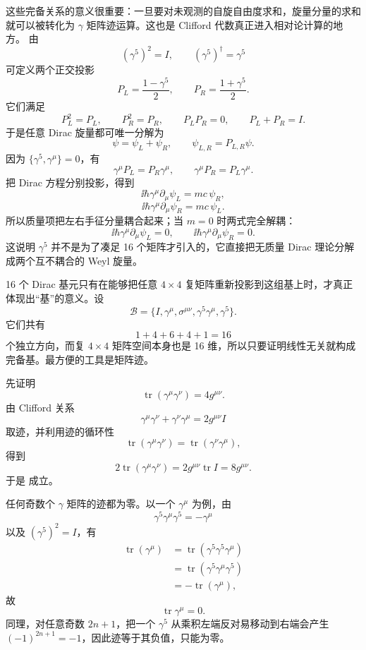 这些完备关系的意义很重要：一旦要对未观测的自旋自由度求和，旋量分量的求和就可以被转化为 $\gamma$ 矩阵迹运算。这也是 Clifford 代数真正进入相对论计算的地方。
由
\[
(\gamma^5)^2=I,
\qquad
(\gamma^5)^\dagger=\gamma^5
\]
可定义两个正交投影
\[
P_L=\frac{1-\gamma^5}{2},
\qquad
P_R=\frac{1+\gamma^5}{2}.
\]
它们满足
\[
P_L^2=P_L,
\qquad
P_R^2=P_R,
\qquad
P_LP_R=0,
\qquad
P_L+P_R=I.
\]
于是任意 Dirac 旋量都可唯一分解为
\[
\psi=\psi_L+\psi_R,
\qquad
\psi_{L,R}=P_{L,R}\psi.
\]
因为 $\{\gamma^5,\gamma^\mu\}=0$，有
\[
\gamma^\mu P_L=P_R\gamma^\mu,
\qquad
\gamma^\mu P_R=P_L\gamma^\mu.
\]
把 Dirac 方程分别投影，得到
\[
\ii\hbar\gamma^\mu\partial_\mu\psi_L=mc\,\psi_R,
\]
\[
\ii\hbar\gamma^\mu\partial_\mu\psi_R=mc\,\psi_L.
\]
所以质量项把左右手征分量耦合起来；当 $m=0$ 时两式完全解耦：
\[
\ii\hbar\gamma^\mu\partial_\mu\psi_L=0,
\qquad
\ii\hbar\gamma^\mu\partial_\mu\psi_R=0.
\]
这说明 $\gamma^5$ 并不是为了凑足 16 个矩阵才引入的，它直接把无质量 Dirac 理论分解成两个互不耦合的 Weyl 旋量。

16 个 Dirac 基元只有在能够把任意 $4\times4$ 复矩阵重新投影到这组基上时，才真正体现出“基”的意义。设
\[
\mathcal B
=\{I,\gamma^\mu,\sigma^{\mu\nu},\gamma^5\gamma^\mu,\gamma^5\}.
\]
它们共有
\[
1+4+6+4+1=16
\]
个独立方向，而复 $4\times4$ 矩阵空间本身也是 16 维，所以只要证明线性无关就构成完备基。最方便的工具是矩阵迹。

先证明
\begin{equation}
\boxed{
\operatorname{tr}(\gamma^\mu\gamma^\nu)=4g^{\mu\nu}
}.
\label{eq:gamma-trace-two}
\end{equation}
由 Clifford 关系
\[
\gamma^\mu\gamma^\nu+\gamma^\nu\gamma^\mu
=2g^{\mu\nu}I
\]
取迹，并利用迹的循环性
\[
\operatorname{tr}(\gamma^\mu\gamma^\nu)
=\operatorname{tr}(\gamma^\nu\gamma^\mu),
\]
得到
\[
2\operatorname{tr}(\gamma^\mu\gamma^\nu)
=2g^{\mu\nu}\operatorname{tr}I
=8g^{\mu\nu}.
\]
于是  成立。

任何奇数个 $\gamma$ 矩阵的迹都为零。以一个 $\gamma^\mu$ 为例，由
\[
\gamma^5\gamma^\mu\gamma^5=-\gamma^\mu
\]
以及 $(\gamma^5)^2=I$，有
\[
\begin{aligned}
\operatorname{tr}(\gamma^\mu)
&=\operatorname{tr}(\gamma^5\gamma^5\gamma^\mu)\\
&=\operatorname{tr}(\gamma^5\gamma^\mu\gamma^5)\\
&=-\operatorname{tr}(\gamma^\mu),
\end{aligned}
\]
故
\[
\operatorname{tr}\gamma^\mu=0.
\]
同理，对任意奇数 $2n+1$，把一个 $\gamma^5$ 从乘积左端反对易移动到右端会产生 $(-1)^{2n+1}=-1$，因此迹等于其负值，只能为零。

